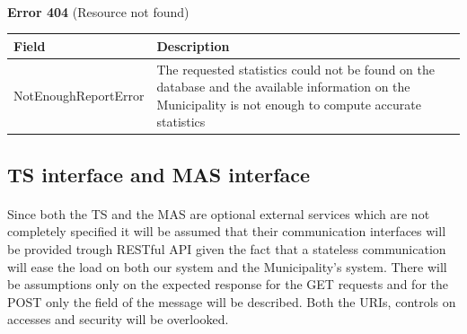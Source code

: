 						\paragraph{}
							\textbf{Error 404} (Resource not found)
							\begin{table}[!h]
								\begin{tabular}{L{0.4\textwidth}L{0.4\textwidth}}
									\toprule
									Field & Description \\
									\midrule
								  	NotEnoughReportError & The requested statistics could not be found on the database and the available information on the Municipality is not enough to compute accurate statistics \\
								 	\bottomrule
								\end{tabular}
							\end{table}

			\clearpage
			\subsection{TS interface and MAS interface}
				\paragraph{}
					Since both the TS and the MAS are optional external services which are not completely specified it will be assumed that their communication interfaces will be provided trough RESTful API given the fact that a stateless communication will ease the load on both our system and the Municipality's system. There will be assumptions only on the expected response for the GET requests and for the POST only the field of the message will be described. Both the URIs, controls on accesses and security will be overlooked.
